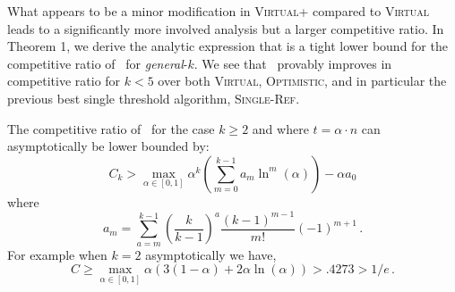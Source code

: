 What appears to be a minor modification in \textsc{Virtual+} compared to \textsc{Virtual} leads to a significantly more involved analysis but a larger competitive ratio. In Theorem 1, we derive the analytic expression that is a tight lower bound for the competitive ratio of \algoname\ for \emph{general}-$k$. We see that \algoname\ provably improves in competitive ratio for $k<5$ over both \textsc{Virtual}, \textsc{Optimistic}, and in particular the previous best single threshold algorithm, \textsc{Single-Ref}.

\begin{theorem}
The competitive ratio of \algoname \ for the case $k \geq 2$ and where $t = \alpha \cdot n$ can asymptotically be lower bounded by: 
\begin{equation}
    C_k >  \max_{\alpha \in [0,1]}  {\alpha}^k \left (\sum_{m = 0}^{k - 1} a_m \ln^m (\alpha)\right) - \alpha a_0
\end{equation}
    where 
\begin{equation}
    a_m = \sum_{a = m}^{k - 1} \left (\frac{k}{k - 1}\right)^a \frac{(k - 1)^{m - 1}}{m!}(-1)^{m + 1}
    \, .
\end{equation}
For example when $k=2$ asymptotically we have,
\begin{equation}
    C \geq  \max_{\alpha \in [0,1]} \alpha ( 3(1-\alpha) + 2 \alpha \ln(\alpha)) > .4273 > 1/e \, .
\end{equation}
\label{thm:K_2_theorem1}
\end{theorem}

